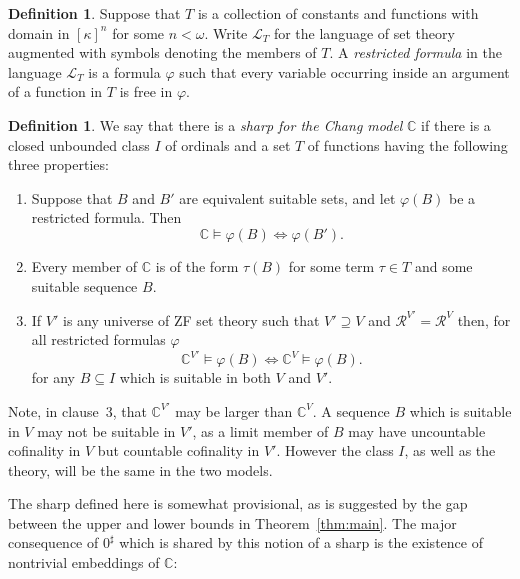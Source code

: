 \documentclass[
twoside,
]{article}
\theoremstyle{definition}
\newtheorem{definition}[theorem]{Definition}
\theoremstyle{remark}
\newcommand\reals{\mathcal{R}}
\renewcommand{\phi}{\varphi}
\newcommand\chang{\mathbb{C}}
\begin{document}
\begin{definition}
  \label{def:restrictedFormula}
  Suppose that  $T$ is a collection of constants and functions with
  domain in $[\kappa]^{n}$ for some $n<\omega$.   Write 
  $\mathcal{L}_{T}$ for the language of set theory augmented with symbols denoting the members of $T$. A \emph{restricted formula} in the language $\mathcal{L}_T$   is  a
  formula $\phi$ such that every variable occurring inside an argument of a function in $T$ is free in $\phi$.
\end{definition}
\begin{definition}
  \label{def:Csharp}
  We say that there is a \emph{sharp for the Chang model} $\chang$ if there
  is a closed unbounded class $I$ of ordinals and a set $T$ of
  functions having the following three properties:

  \begin{enumerate}
  \item
    Suppose that $B$ and $B'$ are equivalent suitable sets, and let
    $\phi(B)$  be a restricted formula.  Then 
    \begin{equation*}
      \chang\models \phi(B)\iff \phi(B').
    \end{equation*}
  \item
    Every member of $\chang$ is of the form $\tau(B)$ for some
    term $\tau\in T$  and some suitable sequence $B$.
  \item
    If $V'$ is any universe of ZF set theory such that $V'\supseteq V$
    and $\reals^{V'}=\reals^{V}$ then, for all restricted formulas
    $\phi$
    \begin{equation*}
      \chang^{V'}\models
      \phi(B)\iff
      \chang^{V}\models\phi(B).
    \end{equation*}
    for any  $B\subseteq I$ which is suitable in both $V$ and $V'$.
  \end{enumerate}
\end{definition}
Note, in clause~3, that $\chang^{V'}$ may be larger than
$\chang^{V}$.   
A sequence $B$ which is suitable  in $V$ may not be suitable in
$V'$, as a limit member of $B$ may have uncountable cofinality in $V$
but countable cofinality in $V'$.   However the class $I$, as well as
the theory, will be the same in the two models.


The sharp defined here is somewhat provisional, as is suggested by the
gap between the upper and lower bounds in Theorem~\ref{thm:main}.  The
major consequence of $0^\sharp$ which is shared by this notion of a
sharp is the existence of nontrivial embeddings of $\chang$:
\end{document}
